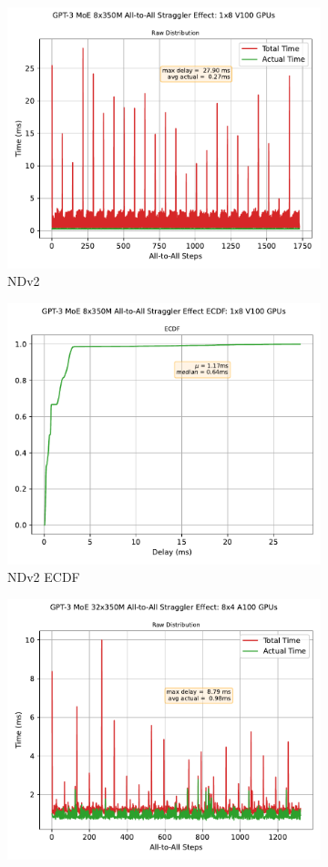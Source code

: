 \begin{figure}[!ht]
    \begin{subfigure}{.5\linewidth}
        \centering
        \includegraphics[width=0.6\linewidth, keepaspectratio]{images/GPT-3_MoE_8x350M}
        \caption{NDv2}
        \label{sub:s_350}
    \end{subfigure}\hfill %
    \begin{subfigure}{.5\linewidth}
        \centering
        \includegraphics[width=0.6\linewidth, keepaspectratio]{images/GPT-3_MoE_8x350M_ecdf}
        \caption{NDv2 ECDF}
        \label{sub:s_350_ecdf}
    \end{subfigure}
    \smallskip %
    \begin{subfigure}{.5\linewidth}
        \centering
        \includegraphics[width=0.6\linewidth, keepaspectratio]{images/GPT-3_MoE_32x350M}

\end{subfigure}
\end{figure}
